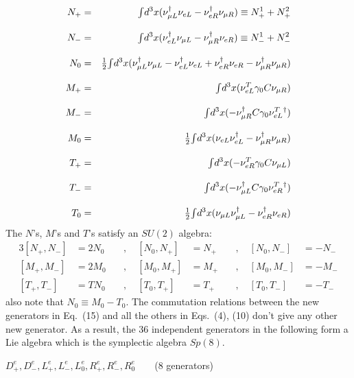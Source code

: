 \documentclass[a4paper,12pt]{article}
\begin{document}
\begin{eqnarray}
N_{+}&=&{\textstyle \int} d^{3}{x(}\nu_{\mu L}^{\dagger }\nu_{eL}-\nu_{eR}^{\dagger
}\nu_{\mu R})\equiv N_{+}^{1}+N_{+}^{2} \nonumber \\[0.3cm]
N_{-}&=&{\textstyle \int} d^{3}{x(}\nu_{eL}^{\dagger }\nu_{\mu L}-\nu_{\mu R}^{\dagger
}\nu_{eR})\equiv N_{-}^{1}+N_{-}^{2} \nonumber \\[0.3cm]
N_0&=&{\textstyle\frac{1}{2}}{\textstyle \int} d^{3}{x}(\nu_{\mu L}^{\dagger }\nu_{\mu L}-\nu
_{eL}^{\dagger }\nu_{eL}+\nu_{eR}^{\dagger }\nu_{eR}-\nu_{\mu
R}^{\dagger }\nu_{\mu R}) \nonumber \\[0.3cm]
M_{+}&=&{\textstyle \int} d^{3}{x(}\nu_{eL}^{T}\gamma_{0}C\nu_{\mu R}) \nonumber \\[0.3cm]
M_{-}&=&{\textstyle \int} d^{3}{x(-}\nu_{\mu R}^{\dagger }C\gamma_{0}\nu
_{eL}^{T}{}^{\dagger })  \\[0.3cm]
M_{0}&=&{\textstyle\frac{1}{2}}{\textstyle \int} d^{3}{x}(\nu_{eL}\nu_{eL}^{\dagger }-\nu_{\mu
R}^{\dagger }\nu_{\mu R}) \nonumber \\[0.3cm]
T_{+}&=&{\textstyle \int} d^{3}{x(-}\nu_{eR}^{T}\gamma_{0}C\nu_{\mu L}) 
\nonumber \\[0.3cm]
T_{-}&=&{\textstyle \int} d^{3}{x(-}\nu_{\mu L}^{\dagger }C\gamma_{0}\nu
_{eR}^{T}{}^{\dagger}) \nonumber \\[0.3cm]
T_{0}&=&{\textstyle\frac{1}{2}}{\textstyle \int} d^{3}{x}(\nu_{\mu L}\nu_{\mu L}^{\dagger }-\nu
_{eR}^{\dagger }\nu_{eR})\nonumber
\end{eqnarray}
The $N$'s, $M$'s and $T$'s satisfy an $SU(2)$ algebra:
\begin{alignat}{3}
[N_{+},N_{-}]&=2N_{0} & \quad, \quad [N_{0},N_{+}]&=N_{+}  & \quad, \quad 
[N_{0},N_{-}]&=-N_{-} \\[0.2cm]
[M_{+},M_{-}]&=2M_{0} & \quad, \quad [M_{0},M_{+}]&=M_{+}  & \quad, \quad 
[M_{0},M_{-}]&=-M_{-} \\[0.2cm]
[T_{+},T_{-}]&=TN_{0} & \quad, \quad [T_{0},T_{+}]&=T_{+}  & \quad, \quad 
[T_{0},T_{-}]&=-T_{-} 
\end{alignat}
also note that $N_{0}\equiv M_{0}- T_{0}$. The commutation relations 
between the  new 
generators in Eq.~(15) and all the others in Eqs.~(4), (10) don't give any other new generator. 
As a result, the 36 independent generators in the following form a Lie
algebra which is the symplectic algebra $Sp(8)$. 
\vspace{8pt}

\qquad$D_{+}^{e},D_{-}^{e},L_{+}^{e},L_{-}^{e},L_{0}^{e},R_{+}^{e},R_{-}^{e},
R_{0}^{e}\qquad$(8 generators)\vspace{8pt}
\end{document}
